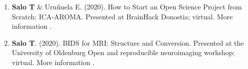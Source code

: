 \documentclass[10pt]{article}
\newcommand{\sectionstyle}{\LARGE \fontfamily{lmr}\selectfont}
\newcommand{\textlink}[3][blue]{\href{#2}{\color{#1}{#3}}}
\begin{document}
\bigskip

\begin{center}\sectionstyle{INVITED TALKS AND SOFTWARE DEMONSTRATIONS}\end{center}

\begin{enumerate}

    \item \textbf{Salo T} \& Uruñuela E.
	(2020).
	How to Start an Open Science Project from Scratch: ICA-AROMA.
    Presented at BrainHack Donostia; virtual.
    More information \textlink{https://nbclab.github.io/presentations/salo-neurosynth-presentation}{here}.

	\bigskip

    \item \textbf{Salo T}.
	(2020).
	BIDS for MRI: Structure and Conversion.
	Presented at the University of Oldenburg Open and reproducible neuroimaging workshop; virtual.
    More information \textlink{https://figshare.com/projects/BIDS_for_MRI_Structure_and_Conversion/92066}{here}.

\end{enumerate}

\bigskip

\begin{center}\sectionstyle{PRESENTATIONS}\end{center}
\end{document}
